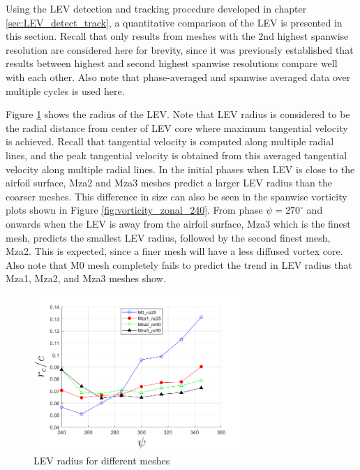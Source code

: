 Using the LEV detection and tracking procedure developed in chapter \ref{sec:LEV_detect_track}, a quantitative comparison of the LEV is presented in this section. 
Recall that only results from meshes with the 2nd highest spanwise resolution are considered here for brevity, since it was previously established that results between highest and second highest spanwise resolutions compare well with each other. 
Also note that phase-averaged and spanwise averaged data over multiple cycles is used here.

Figure \ref{fig:zonal_LEV_radius} shows the radius of the LEV. Note that LEV radius is considered to be the radial distance from center of LEV core where maximum tangential velocity is achieved.
Recall that tangential velocity is computed along multiple radial lines, and the peak tangential velocity is obtained from this averaged tangential velocity along multiple radial lines. 
In the initial phases when LEV is close to the airfoil surface, Mza2 and Mza3 meshes predict a larger LEV radius than the coarser meshes. 
This difference in size can also be seen in the spanwise vorticity plots shown in Figure \ref{fig:vorticity_zonal_240}.
From phase $\psi = 270^\circ$ and onwards when the LEV is away from the airfoil surface, Mza3 which is the finest mesh, predicts the smallest LEV radius, followed by the second finest mesh, Mza2. 
This is expected, since a finer mesh will have a less diffused vortex core. Also note that M0 mesh completely fails to predict the trend in LEV radius that Mza1, Mza2, and Mza3 meshes show.

\begin{figure}[H]
	\centering
	\includegraphics[width=0.7\textwidth]{figures/zonal_adapt_results/LEV/LEV_radius_vp}
	\caption{ LEV radius for different meshes}
	\label{fig:zonal_LEV_radius}
\end{figure}

